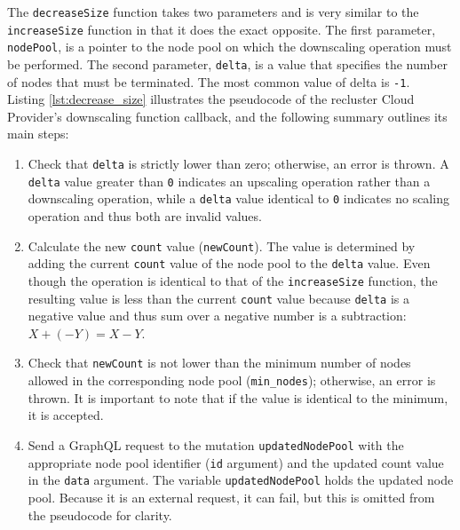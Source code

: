 The \texttt{decreaseSize} function takes two parameters and is very similar to the
\texttt{increaseSize} function in that it does the exact opposite. The first parameter,
\texttt{nodePool}, is a pointer to the node pool on which the downscaling
operation must be performed. The second parameter, \texttt{delta}, is a value
that specifies the number of nodes that must be terminated. The most common value
of delta is \texttt{-1}. \\ %
Listing \ref{lst:decrease_size} illustrates the pseudocode of the recluster Cloud
Provider's downscaling function callback, and the following summary outlines its
main steps:

\begin{enumerate}[label=\protect\circled{\arabic{*}}]
  \item Check that \texttt{delta} is strictly lower than zero; otherwise, an
    error is thrown.
    \newline
    A \texttt{delta} value greater than \texttt{0} indicates an upscaling operation
    rather than a downscaling operation, while a \texttt{delta} value identical to
    \texttt{0} indicates no scaling operation and thus both are invalid values.

  \item Calculate the new \texttt{count} value (\texttt{newCount}).
    \newline
    The value is determined by adding the current \texttt{count} value of the node
    pool to the \texttt{delta} value.
    \newline
    Even though the operation is identical to that of the \texttt{increaseSize}
    function, the resulting value is less than the current \texttt{count} value
    because \texttt{delta} is a negative value and thus sum over a negative number
    is a subtraction: $X + (-Y) = X - Y$.

  \item Check that \texttt{newCount} is not lower than the minimum number of
    nodes allowed in the corresponding node pool (\texttt{min\_nodes});
    otherwise, an error is thrown.
    \newline
    It is important to note that if the value is identical to the minimum, it is
    accepted.

  \item Send a GraphQL request to the mutation \texttt{updatedNodePool} with the
    appropriate node pool identifier (\texttt{id} argument) and the updated count
    value in the \texttt{data} argument. The variable \texttt{updatedNodePool}
    holds the updated node pool.
    \newline
    Because it is an external request, it can fail, but this is omitted from the
    pseudocode for clarity.


\end{enumerate}
